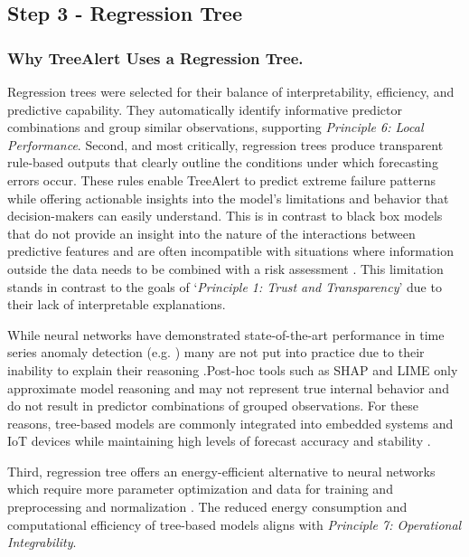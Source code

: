 \documentclass[ijds,sglanonrev]{informs4}
\begin{document}
\subsection{Step 3 - Regression Tree}

\subsubsection{Why TreeAlert Uses a Regression Tree.}

Regression trees were selected for their balance of interpretability, efficiency, and predictive capability. They automatically identify informative predictor combinations and group similar observations, supporting \emph{Principle 6: Local Performance}. Second, and most critically, regression trees produce transparent rule-based outputs that clearly outline the conditions under which forecasting errors occur. These rules enable TreeAlert to predict extreme failure patterns while offering actionable insights into the model's limitations and behavior that decision-makers can easily understand. This is in contrast to black box models that do not provide an insight into the nature of the interactions between predictive features \citep{lai2009} and are often incompatible with situations where information outside the data needs to be combined with a risk assessment \citep{rudin2019}. This limitation stands in contrast to the goals of `\textit{Principle 1: Trust and Transparency}' due to their lack of interpretable explanations.

While neural networks have demonstrated state-of-the-art performance in time series anomaly detection (e.g. \cite{wang2024a}) many are not put into practice due to their inability to explain their reasoning \citep{houssainy2021}.Post-hoc tools such as SHAP and LIME only approximate model reasoning and may not represent true internal behavior \citep{rudin2019} and do not result in predictor combinations of grouped observations. For these reasons, tree-based models are commonly integrated into embedded systems and IoT devices \citep{silva2022} while maintaining high levels of forecast accuracy and stability \citep{houssainy2021}.

Third, regression tree offers an energy-efficient alternative to neural networks which require more parameter optimization and data for training and preprocessing and normalization \citep{reina2023, silva2022, spiliotis2022}. The reduced energy consumption and computational efficiency of tree-based models aligns with \textit{Principle 7: Operational Integrability}.
\end{document}

